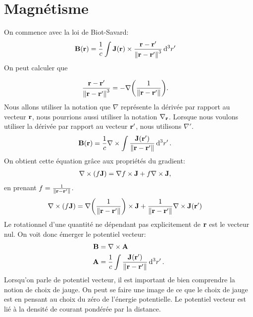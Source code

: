 \titleformat{\section}{
\normalfont\Large\bfseries{
  \color{\MasterColor}\titlerule[0.0pt]
  }
}{\thesection}{1em}{}

\section*{Magnétisme} \label{sec: intro}

On commence avec la loi de Biot-Savard:
\begin{align}
    \vb{B}(\vb{r})&=\frac1c \int\vb{J}(\vb{r})\times\frac{\vb{r}-\vb{r}'}{\norm{\vb{r}-\vb{r}'}^3}\dd[3]{r'}
\end{align}
On peut calculer que

\begin{align}
    \frac{\vb{r}-\vb{r'}}{\norm{\vb{r}-\vb{r}'}^3}&=-\nabla\qty(\frac{1}{\norm{\vb{r}-\vb{r'}}}).
\end{align}
Nous allons utiliser la notation que $\nabla$ représente la dérivée par rapport
au vecteur $\vb{r}$, nous pourrions aussi utiliser la notation $\nabla_{\vb{r}}$.
Lorsque nous voulons utiliser la dérivée par rapport au vecteur $\vb{r'}$, nous
utilisons $\nabla'$.
\begin{align}
    \vb{B}(\vb{r})&=\frac1c\nabla\times\int\frac{\vb{J}(\vb{r'})}{\norm{\vb{r}-\vb{r'}}}\dd[3]{r'}.
\end{align}
On obtient cette équation grâce aux propriétés du gradient:
\begin{align}
    \nabla\times(f\vb{J})&=\nabla f\times\vb{J}+f\nabla\times\vb{J},
\end{align}
en prenant $f=\frac1{\norm{\vb{r}-\vb{r'}}}$.
\begin{align}
    \nabla\times(f\vb{J})&=\nabla\qty(\frac1{\norm{\vb{r}-\vb{r'}}})\times\vb{J}
        +\frac1{\norm{\vb{r}-\vb{r'}}}\nabla\times\vb{J}(\vb{r'})
\end{align}
Le rotationnel d'une quantité ne dépendant pas explicitement de $\vb{r}$ est
le vecteur nul. On voit donc émerger le potentiel vecteur:
\begin{align}
    \vb{B}&=\nabla\times\vb{A}\\
    \vb{A}&=\frac1c\int\frac{\vb{J}(\vb{r'})}{\norm{\vb{r}-\vb{r'}}}\dd[3]{r'}.
\end{align}
Lorsqu'on parle de potentiel vecteur, il est important de bien comprendre la notion
de choix de jauge. On peut se faire une image de ce que le choix de jauge est
en pensant au choix du zéro de l'énergie potentielle. Le potentiel vecteur est
lié à la densité de courant pondérée par la distance.

